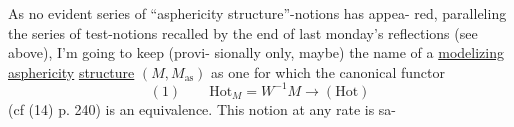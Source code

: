 As no evident series of ``asphericity structure''-notions has appea-%
red, paralleling the series of test-notions  recalled by the
end of last monday's reflections (see above), I'm going to keep (provi-%
sionally only, maybe) the name of a \uline{modelizing} \uline{asphericity} \uline{structure}
$(M,M_{\mathrm{as}})$ as one for which the canonical functor
\[
(1) \qquad \mathrm{Hot}_{M} = W^{-1}M \longrightarrow (\mathrm{Hot})
\]
(cf (14) p. 240) is an equivalence. This notion at any rate is sa-%
